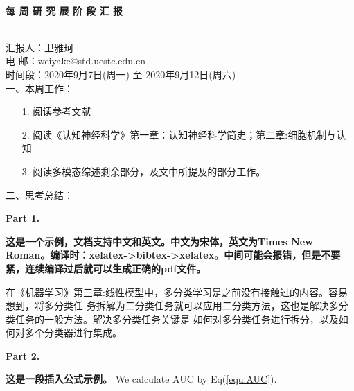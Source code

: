 \documentclass[UTF8,10.5pt]{article} %
\begin{document}
~\\
\centerline{ \large \bf{每} \hspace{0.07cm} \bf{周}\hspace{0.07cm} \bf{研} \hspace{0.07cm}\bf{究} \hspace{0.07cm}\bf{展} \hspace{0.07cm}\bf{阶}\hspace{0.07cm} \bf{段}\hspace{0.07cm} \bf{汇} \hspace{0.07cm}\bf{报}}
~\\

\noindent 汇报人：卫雅珂 \\
\noindent 电\hspace{0.29cm} 邮：weiyake@std.uestc.edu.cn \\
\noindent 时间段：2020年9月7日(周一) 至 2020年9月12日(周六) \\

\noindent 一、本周工作：

\begin{enumerate}[labelsep = .5em, leftmargin = -18pt, itemindent = 3em]
    \item [1.] 阅读参考文献\cite{tian2021unsupervised,NEURIPS2018_01161aaa,gao2018learning,uijlings2013selective,cinbis2016weakly}    
    \item [2.] 阅读《认知神经科学》第一章：认知神经科学简史；第二章:细胞机制与认知
    \item [3.] 阅读多模态综述剩余部分，及文中所提及的部分工作。
\end{enumerate}
\vspace{0.3cm}

\noindent 二、思考总结：

\noindent \textbf{Part 1.} 

\textbf{这是一个示例，文档支持中文和英文。中文为宋体，英文为Times New Roman。编译时：xelatex->bibtex->xelatex。中间可能会报错，但是不要紧，连续编译过后就可以生成正确的pdf文件。}

在《机器学习》第三章:线性模型中，多分类学习是之前没有接触过的内容。容易想到，将多分类任 务拆解为二分类任务就可以应用二分类方法，这也是解决多分类任务的一般方法。解决多分类任务关键是 如何对多分类任务进行拆分，以及如何对多个分类器进行集成。


\vspace{0.5cm}
\noindent \textbf{Part 2.} 

\textbf{这是一段插入公式示例。}
We calculate AUC by Eq(\ref{equ:AUC}).
\end{document}
